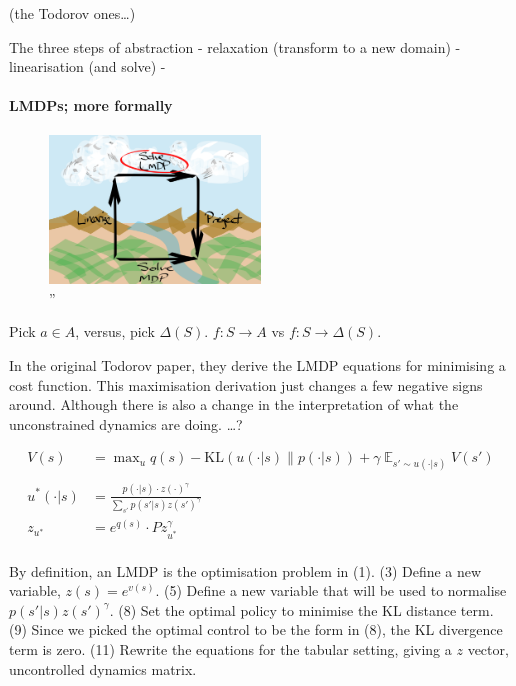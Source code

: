(the Todorov ones\ldots{})

The three steps of abstraction - relaxation (transform to a new domain)
- linearisation (and solve) -

\hypertarget{lmdps-more-formally}{%
\paragraph{LMDPs; more formally}\label{lmdps-more-formally}}

\begin{figure}
\centering
\includegraphics[width=0.5\textwidth,height=0.5\textheight]{../../pictures/drawings/abstract-representations-solve.png}
\caption{''}
\end{figure}

Pick \(a \in A\), versus, pick \(\Delta(S)\). \(f: S\to A\) vs
\(f:S \to \Delta(S)\).

In the original Todorov paper, they derive the LMDP equations for
minimising a cost function. This maximisation derivation just changes a
few negative signs around. Although there is also a change in the
interpretation of what the unconstrained dynamics are doing. \ldots{}?

\begin{align}
V(s) &= \mathop{\text{max}}_{u} q(s) - \text{KL}(u(\cdot| s) \parallel p(\cdot | s)) + \gamma \mathop{\mathbb E}_{s' \sim u(\cdot | s)} V(s') \tag{1}\\
\\
u^{* }(\cdot | s) &= \frac{p(\cdot | s)\cdot z(\cdot)^{\gamma}}{\sum_{s'} p(s' | s) z(s')^{\gamma}} \tag{8}\\
z_{u^{* }} &= e^{q(s)}\cdot P z_{u^{* }}^{\gamma} \tag{11}\\
\end{align}

By definition, an LMDP is the optimisation problem in (1). (3) Define a
new variable, \(z(s) = e^{v(s)}\). (5) Define a new variable that will
be used to normalise \(p(s' | s)z(s')^{\gamma}\). (8) Set the optimal
policy to minimise the KL distance term. (9) Since we picked the optimal
control to be the form in (8), the KL divergence term is zero. (11)
Rewrite the equations for the tabular setting, giving a \(z\) vector,
uncontrolled dynamics matrix.

